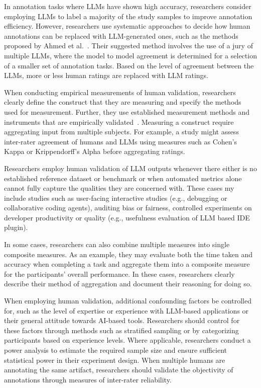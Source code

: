 In annotation tasks where LLMs have shown high accuracy, researchers \may consider employing LLMs to label a majority of the study samples to improve annotation efficiency.
However, researchers \should use systematic approaches to decide how human annotations can be replaced with LLM-generated ones, such as the methods proposed by Ahmed et al.~\cite{DBLP:journals/corr/abs-2408-05534}.
Their suggested method involves the use of a jury of multiple LLMs, where the model to model agreement is determined for a selection of a smaller set of annotation tasks.
Based on the level of agreement between the LLMs, more or less human ratings are replaced with LLM ratings.

When conducting empirical measurements of human validation, researchers \must clearly define the construct that they are measuring and \must specify the methods used for measurement. 
Further, they \should use established measurement methods and instruments that are empirically validated~\cite{DBLP:journals/fcomp/HoffmanMKL23, DBLP:conf/chi/PerrigSB23}.
Measuring a construct \may require aggregating input from multiple subjects. 
For example, a study might assess inter-rater agreement of humans and LLMs using measures such as Cohen's Kappa or Krippendorff's Alpha before aggregating ratings.

Researchers \should employ human validation of LLM outputs whenever there either is no established reference dataset or benchmark or when automated metrics alone cannot fully capture the qualities they are concerned with.
These cases my include studies such as user-facing interactive studies (e.g., debugging or collaborative coding agents), auditing bias or fairness, controlled experiments on developer productivity or quality (e.g., usefulness evaluation of LLM based IDE plugin).

In some cases, researchers can also combine multiple measures into single composite measures.
As an example, they may evaluate both the time taken and accuracy when completing a task and aggregate them into a composite measure for the participants' overall performance.
In these cases, researchers \should clearly describe their method of aggregation and document their reasoning for doing so.

When employing human validation, additional confounding factors \should be controlled for, such as the level of expertise or experience with LLM-based applications or their general attitude towards AI-based tools.
Researchers should control for these factors through methods such as stratified sampling or by categorizing participants based on experience levels.
Where applicable, researchers \should conduct a power analysis to estimate the required sample size and ensure sufficient statistical power in their experiment design.
When multiple humans are annotating the same artifact, researchers should validate the objectivity of annotations through measures of inter-rater reliability.

